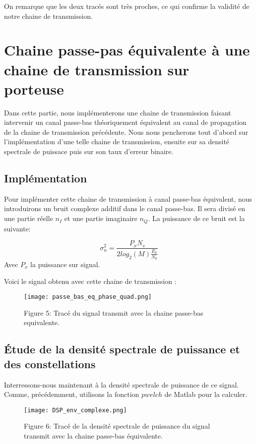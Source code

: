 \documentclass[englishb]{article}
\begin{document}
On remarque que les deux tracés sont très proches, ce qui confirme la validité de notre chaine de transmission.


\section{Chaine passe-pas équivalente à une chaine de transmission sur porteuse}

Dans cette partie, nous implémenterons une chaine de transmission faisant intervenir un canal passe-bas théoriquement équivalent au canal de propagation de la chaine de transmission précédente. Nous nous pencherons tout d'abord sur l'implémentation d'une telle chaine de transmission, ensuite sur sa densité spectrale de puissace puis sur son taux d'erreur binaire.

\subsection{Implémentation}
Pour implémenter cette chaine de transmission à canal passe-bas équivalent, nous introduirons un bruit complexe additif dans le canal passe-bas. Il sera divisé en une partie réelle $n_I$ et une partie imaginaire $n_Q$. La puissance de ce bruit est la suivante:
\begin{center}

$$\sigma^2 _n = \frac{P_x N_s}{2log_2 (M) \frac{E_b}{N_0}}$$ Avec $P_x$ la puissance sur signal.

\end{center}

Voici le signal obtenu avec cette chaine de transmission :

\begin{figure}[H]
    \centering
    \texttt{[image: passe\_bas\_eq\_phase\_quad.png]}
    
    Figure 5: Tracé du signal transmit avec la chaine passe-bas equivalente.
\end{figure}


\subsection{Étude de la densité spectrale de puissance et des constellations}
Interressons-nous maintenant à la densité spectrale de puissance de ce signal. Comme, précédemment, utilisons la fonction $pwelch$ de Matlab pour la calculer.

\begin{figure}[H]
    \centering
    \texttt{[image: DSP\_env\_complexe.png]}
    
    Figure 6: Tracé de la densité spectrale de puissance du signal transmit avec la chaine passe-bas équivalente.
\end{figure}
\end{document}
